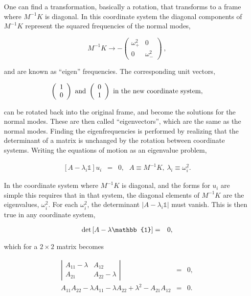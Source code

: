 \documentclass[%
oneside,                 %
final,                   %
10pt]{article}
\begin{document}
One can find a transformation, basically a rotation, that transforms
to a frame where $M^{-1}K$ is diagonal. In this coordinate system the
diagonal components of $M^{-1}K$ represent the squared frequencies of
the normal modes,

\[
M^{-1}K\rightarrow -\left(\begin{array}{cc}
\omega_+^2&0\\
0&\omega_-^2\end{array}\right)~,
\]

and are known as ``eigen'' frequencies. The corresponding unit vectors,

\[
\left(\begin{array}{c}
1\\0\end{array}\right)~{\rm and}~\left(\begin{array}{c}
0\\1\end{array}\right)~{\rm in~the~new~coordinate~system},
\]

can be rotated back into the original frame, and become the solutions
for the normal modes. These are then called ``eigenvectors'', which
are the same as the normal modes. Finding the eigenfrequencies is
performed by realizing that the determinant of a matrix is unchanged
by the rotation between coordinate systems. Writing the equations of
motion as an eigenvalue problem,

\begin{eqnarray}
\left[A-\lambda_i\mathbb{1}\right]u_i&=&0,~~~A\equiv M^{-1}K,~\lambda_i\equiv \omega^2_i.
\end{eqnarray}

In the coordinate system where $M^{-1}K$ is diagonal, and the forms
for $u_i$ are simple this requires that in that system, the diagonal
elements of $M^{-1}K$ are the eigenvalues, $\omega_i^2$. For each
$\omega^2_i$, the determinant $|A-\lambda_i\mathbb{1}|$ must
vanish. This is then true in any coordinate system,

\begin{eqnarray}
{\rm det}\left[A-\lambda\mathbb{1}\right]&=&0,
\end{eqnarray}

which for a $2\times 2$ matrix becomes

\begin{eqnarray}
\left|
\begin{array}{cc}
A_{11}-\lambda&A_{12}\\
A_{21}&A_{22}-\lambda
\end{array}
\right|&=&0,\\
A_{11}A_{22}-\lambda A_{11}-\lambda A_{22}+\lambda^2-A_{21}A_{12}&=&0.
\end{eqnarray}
\end{document}
